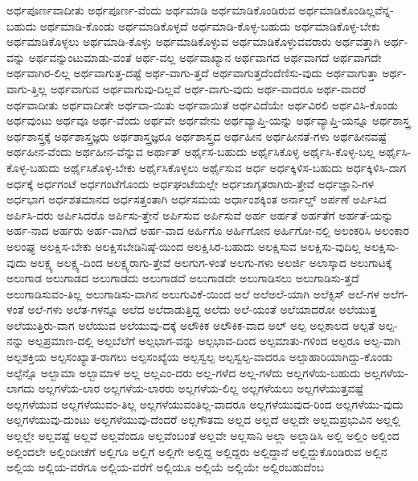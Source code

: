 {ಅರ್ಥಪೂರ್ಣವಾದೀತು
ಅರ್ಥಪೂರ್ಣ-ವೆಂದು
ಅರ್ಥಮಾಡಿ
ಅರ್ಥಮಾಡಿಕೊಂಡಿರುವ
ಅರ್ಥಮಾಡಿಕೊಂಡಿಲ್ಲವೆನ್ನ-ಬಹುದು
ಅರ್ಥಮಾಡಿ-ಕೊಂಡು
ಅರ್ಥಮಾಡಿಕೊಳ್ಳದೆ
ಅರ್ಥಮಾಡಿ-ಕೊಳ್ಳ-ಬಹುದು
ಅರ್ಥಮಾಡಿಕೊಳ್ಳ-ಬೇಕು
ಅರ್ಥಮಾಡಿಕೊಳ್ಳಲು
ಅರ್ಥಮಾಡಿ-ಕೊಳ್ಳು
ಅರ್ಥಮಾಡಿಕೊಳ್ಳುವ
ಅರ್ಥಮಾಡಿಕೊಳ್ಳುವವರಾರು
ಅರ್ಥವತ್ತಾಗಿ
ಅರ್ಥ-ವನ್ನು
ಅರ್ಥವನ್ನುಂಟುಮಾಡು-ವಂತೆ
ಅರ್ಥ-ವಲ್ಲ
ಅರ್ಥವಾಖ್ಯಾನ
ಅರ್ಥವಾಗದ
ಅರ್ಥವಾಗದೆ
ಅರ್ಥವಾಗದೇ
ಅರ್ಥವಾಗಿರ-ಲಿಲ್ಲ
ಅರ್ಥವಾಗುತ್ತ-ದಷ್ಟೆ
ಅರ್ಥ-ವಾಗು-ತ್ತದೆ
ಅರ್ಥವಾಗುತ್ತದೆಂದೆಣಿಸು-ವುದು
ಅರ್ಥವಾಗುತ್ತಾ
ಅರ್ಥ-ವಾಗು-ತ್ತಿಲ್ಲ
ಅರ್ಥವಾಗುವ
ಅರ್ಥವಾಗುವು-ದಿಲ್ಲವೆ
ಅರ್ಥ-ವಾಗು-ವುದು
ಅರ್ಥ-ವಾದರೂ
ಅರ್ಥ-ವಾದರೆ
ಅರ್ಥವಾದೀತು
ಅರ್ಥವಾದೀತೇ
ಅರ್ಥವಾ-ಯಿತು
ಅರ್ಥವಾಯಿತೆ
ಅರ್ಥವಿದೆಯೇ
ಅರ್ಥವಿರಲಿ
ಅರ್ಥವಿಸಿ-ಕೊಂಡು
ಅರ್ಥವುಂಟು
ಅರ್ಥವೂ
ಅರ್ಥ-ವೆಂದು
ಅರ್ಥವೇ
ಅರ್ಥವೇನು
ಅರ್ಥವ್ಯಾಪ್ತಿ-ಯನ್ನು
ಅರ್ಥವ್ಯಾಪ್ತಿ-ಯನ್ನೂ
ಅರ್ಥಶಾಸ್ತ್ರ
ಅರ್ಥಶಾಸ್ತ್ರಕ್ಕೆ
ಅರ್ಥಶಾಸ್ತ್ರಜ್ಞರು
ಅರ್ಥಶಾಸ್ತ್ರಜ್ಞರೂ
ಅರ್ಥಶಾಸ್ತ್ರದ
ಅರ್ಥಹೀನ
ಅರ್ಥಹೀನತೆ-ಗಳು
ಅರ್ಥಹೀನವಷ್ಟೆ
ಅರ್ಥಹೀನ-ವೆಂದು
ಅರ್ಥಹೀನ-ವೆನ್ನುವ
ಅರ್ಥಾತ್
ಅರ್ಥೈಸ-ಬಹುದು
ಅರ್ಥೈಸಿಕೊಳ್ಳ
ಅರ್ಥೈಸಿ-ಕೊಳ್ಳ-ಬಲ್ಲ
ಅರ್ಥೈಸಿ-ಕೊಳ್ಳ-ಬಹುದು
ಅರ್ಥೈಸಿಕೊಳ್ಳ-ಬೇಕು
ಅರ್ಥೈಸಿಕೊಳ್ಳಲು
ಅರ್ಥೈಸುವ
ಅರ್ಧ
ಅರ್ಧಕ್ಕಿಳಿಸ-ಬಹುದು
ಅರ್ಧಕ್ಕಿಳಿಸಿ-ದಾಗ
ಅರ್ಧಕ್ಕೆ
ಅರ್ಧಗಂಟೆ
ಅರ್ಧಗಂಟೆಗೊಂದು
ಅರ್ಧಘಂಟೆಯಲ್ಲೇ
ಅರ್ಧಜಾಗೃತರಾಗಿರು-ತ್ತೇವೆ
ಅರ್ಧಜ್ಞಾನಿ-ಗಳ
ಅರ್ಧಭಾಗ
ಅರ್ಧಶತಮಾನದ
ಅರ್ಧಸತ್ತಂತಾಗಿ
ಅರ್ಧಸಮಯ
ಅರ್ಧಾಂಶಕ್ಕಿಂತ
ಅರ್ನಾಲ್ಡ್
ಅರ್ಪಣೆ
ಅರ್ಪಿಸಿದ
ಅರ್ಪಿಸಿ-ದರು
ಅರ್ಪಿಸಿದರೊ
ಅರ್ಪಿಸು-ತ್ತೇನೆ
ಅರ್ಪಿಸುವ
ಅರ್ಪಿಸುವೆ
ಅರ್ಹ
ಅರ್ಹತೆ
ಅರ್ಹತೆಗೆ
ಅರ್ಹತೆ-ಯನ್ನು
ಅರ್ಹ-ನಾದ
ಅರ್ಹರು
ಅರ್ಹ-ವಾಗಿದೆ
ಅರ್ಹ-ವಾದ
ಅರ್ಹಿಗೊ
ಅರ್ಹಿಗೋನ
ಅರ್ಹಿಗೋ-ನಲ್ಲಿ
ಅಲಂಕರಿಸಿ
ಅಲಂಕಾರ
ಅಲಂಘ್ಯ
ಅಲಕ್ಷಿಸ-ಬೇಕು
ಅಲಕ್ಷಿಸಬೇಡಿನಿಷ್ಠೆ-ಯಿಂದ
ಅಲಕ್ಷಿಸಿರ-ಬಹುದು
ಅಲಕ್ಷಿಸುವ
ಅಲಕ್ಷಿಸು-ವುದಿಲ್ಲ
ಅಲಕ್ಷಿಸು-ವುದು
ಅಲಕ್ಷ್ಯ
ಅಲಕ್ಷ್ಯ-ದಿಂದ
ಅಲಕ್ಷ್ಯರಾಗು-ತ್ತೇವೆ
ಅಲಗುಗ-ಳಂತೆ
ಅಲಗು-ಗಳು
ಅಲರ್ಜಿ
ಅಲಾಸ್ಕಾದ
ಅಲುಗಾಟಕ್ಕೆ
ಅಲುಗಾಡ
ಅಲುಗಾಡದ
ಅಲುಗಾಡದು
ಅಲುಗಾಡದೆ
ಅಲುಗಾಡದೇ
ಅಲುಗಾಡಿಸಲು
ಅಲುಗಾಡಿಸು-ತ್ತದೆ
ಅಲುಗಾಡಿಸುವಂ-ತಿಲ್ಲ
ಅಲುಗಾಡಿಸು-ವಾಗಿನ
ಅಲುಗುವಿಕೆ-ಯಿಂದ
ಅಲೆ
ಅಲೆಅಲೆ-ಯಾಗಿ
ಅಲೆಕ್ಸಿಸ್
ಅಲೆ-ಗಳ
ಅಲೆಗ-ಳಂತೆ
ಅಲೆ-ಗಳು
ಅಲೆತ-ಗಳನ್ನೂ
ಅಲೆದ
ಅಲೆದಾಡುತ್ತಿದ್ದ
ಅಲೆದು
ಅಲೆ-ಯಂತೆ
ಅಲೆಯಾದರೋ
ಅಲೆಯುತ್ತ
ಅಲೆಯುತ್ತಿರು-ವಾಗ
ಅಲೆಯುವ
ಅಲೆಯುವು-ದಕ್ಕೆ
ಅಲೌಕಿಕ
ಅಲೌಕಿಕ-ವಾದ
ಅಲ್
ಅಲ್ಪ
ಅಲ್ಪಕಾಲದ
ಅಲ್ಪತೆ
ಅಲ್ಪ-ನನ್ನು
ಅಲ್ಪಪ್ರಮಾಣ-ದಲ್ಲಿ
ಅಲ್ಪಬೆಲೆಗೆ
ಅಲ್ಪಭಾಗ-ವನ್ನು
ಅಲ್ಪಭಾವ-ದಿಂದ
ಅಲ್ಪಮಾತು-ಗಳಿಂದ
ಅಲ್ಪರೂ
ಅಲ್ಪ-ವಾಗಿ
ಅಲ್ಪಶಕ್ತಿಯ
ಅಲ್ಪಸಂಖ್ಯಾತ-ರಾಗಲು
ಅಲ್ಪಸಂಖ್ಯೆಯ
ಅಲ್ಪಸ್ವಲ್ಪ
ಅಲ್ಪಸ್ವಲ್ಪ-ವಾದರೂ
ಅಲ್ಪಾಹಾರಿಯಾಗಿದ್ದು-ಕೊಂಡು
ಅಲ್ಫೆನ್ಸೊ
ಅಲ್ಬಾಮಾ
ಅಲ್ಬಾಮಾಳ
ಅಲ್ಲ
ಅಲ್ಲಎಂ-ದರು
ಅಲ್ಲ-ಗಳೆದ
ಅಲ್ಲ-ಗಳೆದು
ಅಲ್ಲಗಳೆಯ-ಬಹುದು
ಅಲ್ಲಗಳೆಯ-ಲಾಗದು
ಅಲ್ಲಗಳೆಯ-ಲಾರ
ಅಲ್ಲಗಳೆಯ-ಲಾರರು
ಅಲ್ಲಗಳೆಯ-ಲಿಲ್ಲ
ಅಲ್ಲಗಳೆಯಲು
ಅಲ್ಲಗಳೆಯುತ್ತವಷ್ಟೆ
ಅಲ್ಲಗಳೆಯುವ
ಅಲ್ಲಗಳೆಯುವಂ-ತಿಲ್ಲ
ಅಲ್ಲಗಳೆಯುವಂತಿಲ್ಲ-ವಾದರೂ
ಅಲ್ಲಗಳೆಯುವುದ-ರಿಂದ
ಅಲ್ಲಗಳೆಯು-ವುದು
ಅಲ್ಲಗಳೆಯುವು-ದುಂಟು
ಅಲ್ಲಗಳೆಯುವು-ದೆಂದರೆ
ಅಲ್ಲಗೌತಮ
ಅಲ್ಲದ
ಅಲ್ಲದೆ
ಅಲ್ಲದೇ
ಅಲ್ಲಮಪ್ರಭುವಿನ
ಅಲ್ಲಲ್ಲಿ
ಅಲ್ಲಲ್ಲೇ
ಅಲ್ಲವಷ್ಟೆ
ಅಲ್ಲವೆ
ಅಲ್ಲವೆಂದೂ
ಅಲ್ಲವೆಂಬಂತೆ
ಅಲ್ಲವೇ
ಅಲ್ಲಸಾನಿ
ಅಲ್ಲಾ
ಅಲ್ಲಾಡಿಸಿ
ಅಲ್ಲಿ
ಅಲ್ಲಿಂ
ಅಲ್ಲಿಂದ
ಅಲ್ಲಿಂದಲೇ
ಅಲ್ಲಿಂದೀಚೆಗೆ
ಅಲ್ಲಿಗೂ
ಅಲ್ಲಿಗೆ
ಅಲ್ಲಿಗೇ
ಅಲ್ಲಿದ್ದ
ಅಲ್ಲಿದ್ದರು
ಅಲ್ಲಿದ್ದಾನೆ
ಅಲ್ಲಿದ್ದುಕೊಂಡಿರುವ
ಅಲ್ಲಿನ
ಅಲ್ಲಿಯ
ಅಲ್ಲಿಯ-ವರೆಗೂ
ಅಲ್ಲಿಯ-ವರೆಗೆ
ಅಲ್ಲಿಯೂ
ಅಲ್ಲಿಯೆ
ಅಲ್ಲಿಯೇ
ಅಲ್ಲಿರಬಹುದೆಂಬ
}
